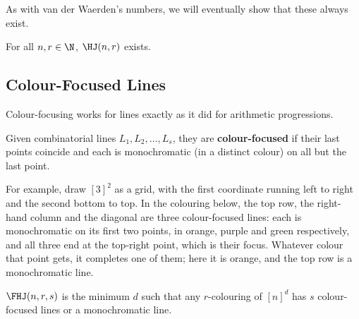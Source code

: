 As with van der Waerden's numbers, we will eventually show that these always exist.

\begin{boxtheorem} \label{Ch6:Thm:Hales_Jewett}
    For all $n, r \in \N$, $\HJ(n, r)$ exists.
\end{boxtheorem}

\subsection{Colour-Focused Lines}

Colour-focusing works for lines exactly as it did for arithmetic progressions.

\begin{boxdefinition}
    Given combinatorial lines $L_1, L_2, \ldots, L_s$, they are \textbf{colour-focused} if their last points coincide and each is monochromatic (in a distinct colour) on all but the last point.
\end{boxdefinition}

For example, draw $[3]^2$ as a grid, with the first coordinate running left to right and the second bottom to top. In the colouring below, the top row, the right-hand column and the diagonal are three colour-focused lines: each is monochromatic on its first two points, in orange, purple and green respectively, and all three end at the top-right point, which is their focus. Whatever colour that point gets, it completes one of them; here it is orange, and the top row is a monochromatic line.

\begin{figure}[H]
    \centering
\end{figure}

\begin{boxdefinition}
    $\FHJ(n, r, s)$ is the minimum $d$ such that any $r$-colouring of $[n]^d$ has $s$ colour-focused lines or a monochromatic line.
\end{boxdefinition}

